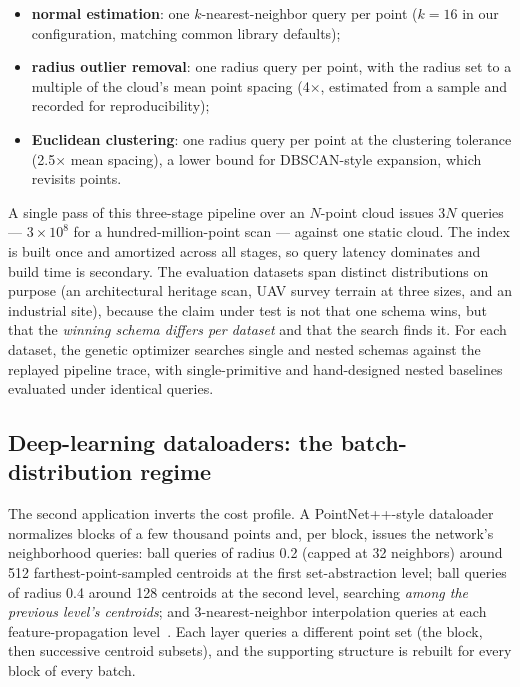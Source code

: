 \begin{itemize}[leftmargin=*]
  \item \textbf{normal estimation}: one $k$-nearest-neighbor query per point ($k{=}16$ in our configuration, matching common library defaults);
  \item \textbf{radius outlier removal}: one radius query per point, with the radius set to a multiple of the cloud's mean point spacing (4$\times$, estimated from a sample and recorded for reproducibility);
  \item \textbf{Euclidean clustering}: one radius query per point at the clustering tolerance (2.5$\times$ mean spacing), a lower bound for DBSCAN-style expansion, which revisits points.
\end{itemize}

A single pass of this three-stage pipeline over an $N$-point cloud issues $3N$ queries --- $3\times10^8$ for a hundred-million-point scan --- against one static cloud. The index is built once and amortized across all stages, so query latency dominates and build time is secondary. The evaluation datasets span distinct distributions on purpose (an architectural heritage scan, UAV survey terrain at three sizes, and an industrial site), because the claim under test is not that one schema wins, but that the \emph{winning schema differs per dataset} and that the search finds it. For each dataset, the genetic optimizer searches single and nested schemas against the replayed pipeline trace, with single-primitive and hand-designed nested baselines evaluated under identical queries.

\subsection{Deep-learning dataloaders: the batch-distribution regime}
\label{sec:app-batch}

The second application inverts the cost profile. A PointNet++-style dataloader normalizes blocks of a few thousand points and, per block, issues the network's neighborhood queries: ball queries of radius 0.2 (capped at 32 neighbors) around 512 farthest-point-sampled centroids at the first set-abstraction level; ball queries of radius 0.4 around 128 centroids at the second level, searching \emph{among the previous level's centroids}; and 3-nearest-neighbor interpolation queries at each feature-propagation level~\cite{qi2017pointnetpp}. Each layer queries a different point set (the block, then successive centroid subsets), and the supporting structure is rebuilt for every block of every batch.

